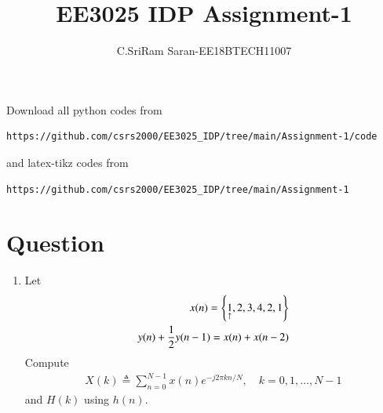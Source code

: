 \documentclass[journal,12pt,twocolumn]{IEEEtran}
\renewcommand\thesection{\arabic{section}}
\begin{document}
     \def\midbox#1{\raisebox{-0.5\baselineskip}[0in][0in]{#1}}
\vspace{3cm}
\title{EE3025 IDP Assignment-1}
\author{C.SriRam Saran-EE18BTECH11007}
\maketitle
\newpage
\bigskip
\renewcommand{\thefigure}{\theenumi}
\renewcommand{\thetable}{\theenumi}
Download all python codes from 
\begin{lstlisting}
https://github.com/csrs2000/EE3025_IDP/tree/main/Assignment-1/code
\end{lstlisting}
%
and latex-tikz codes from 
%
\begin{lstlisting}
https://github.com/csrs2000/EE3025_IDP/tree/main/Assignment-1
\end{lstlisting}
\section{Question}
\begin{enumerate}[label=\thesection.\arabic*.,ref=\thesection.\theenumi]
    
\item Let
\begin{align}
    x(n) = \left\{\underset{\uparrow}{1},2,3,4,2,1\right\} \\
    y(n) + \frac{1}{2}y(n-1) = x(n) + x(n-2) \label{eq:1.0.2}
\end{align}
Compute
\begin{align}
    X(k) \triangleq \sum_{n=0}^{N-1}x(n)e^{-j2\pi kn/N},\quad k=0,1, \ldots, N-1
\end{align}
and $H(k)$ using $h(n)$.
\end{enumerate}
\end{document}
